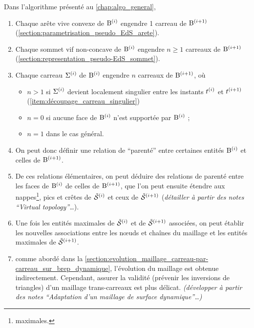 Dans l'algorithme présenté au \autoref{chap:algo_general}, 
\begin{enumerate}
	\item Chaque arête vive convexe de $\mathrm{B}^{(i)}$ engendre 1 carreau de $\mathrm{B}^{(i+1)}$ (\cf \autoref{section:parametrisation_pseudo_EdS_arete}). 
	\item Chaque sommet vif non-concave de $\mathrm{B}^{(i)}$ engendre $n \geq 1$ carreaux de $\mathrm{B}^{(i+1)}$ (\cf \autoref{section:representation_pseudo-EdS_sommet}).
	\item Chaque carreau $\Sigma^{(i)}$ de $\mathrm{B}^{(i)}$ engendre $n$ carreaux de $\mathrm{B}^{(i+1)}$, où
	\begin{itemize}
		\item $n > 1$ si $\Sigma^{(i)}$ devient localement singulier entre les instants $t^{(i)}$ et $t^{(i+1)}$ (\cf \autoref{item:découpage_carreau_singulier})
		\item $n = 0$ si aucune face de $\mathrm{B}^{(i)}$ n'est supportée par $\mathrm{B}^{(i)}$ ;
		\item $n = 1$ dans le cas général.
	\end{itemize}
	
	\item On peut donc définir une relation de ``parenté'' entre certaines entités $\mathrm{B}^{(i)}$ et celles de $\mathrm{B}^{(i+1)}$.
	
	\item De ces relations élémentaires, on peut déduire des relations de parenté entre les faces de $\mathrm{B}^{(i)}$ de celles de $\mathrm{B}^{(i+1)}$, que l'on peut ensuite étendre aux nappes\footnote{maximales.\label{foot:maximal}}, pics et crêtes de $\tilde{\mathcal{S}}^{(i)}$ et ceux de $\tilde{\mathcal{S}}^{(i+1)}$ (\textit{détailler à partir des notes ``Virtual topology''\ldots}).
	
	\item Une fois les entités maximales de $\tilde{\mathcal{S}}^{(i)}$ et de $\tilde{\mathcal{S}}^{(i+1)}$ associées, on peut établir les nouvelles associations entre les n\oe uds et chaînes du maillage et les entités maximales de $\tilde{\mathcal{S}}^{(i+1)}$. 
	
	\item comme abordé dans la \autoref{section:evolution_maillage_carreau-par-carreau_sur_brep_dynamique}, l'évolution du maillage est obtenue indirectement.
	Cependant, assurer la validité (\ie prévenir les inversions de triangles) d'un maillage trans-carreaux est plus délicat.
	\textit{(développer à partir des notes ``Adaptation d'un maillage de surface dynamique''\ldots)}


\end{enumerate}
